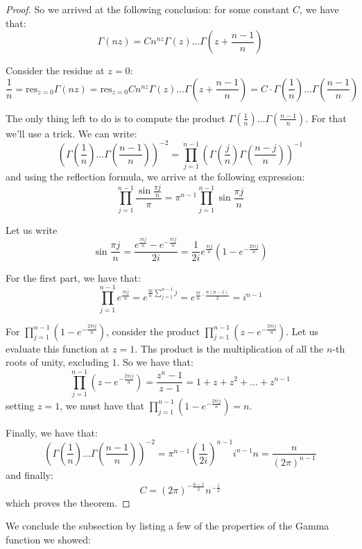 \documentclass[11pt]{article} %
\theoremstyle{definition}
\theoremstyle{remark}
\newcommand{\res}{\text{res}}
\begin{document}
\begin{proof}
So we arrived at the following conclusion: for some constant $C$, we have that:
\[ \Gamma\left(nz\right) = Cn^{nz} \Gamma\left(z\right)\dots\Gamma\left(z + \frac{n-1}{n}\right) \]

Consider the residue at $z = 0$:
\[ \frac{1}{n} = \res_{z=0} \Gamma\left(nz\right) = \res_{z=0} Cn^{nz}\Gamma\left(z\right)\dots\Gamma\left(z+\frac{n-1}{n}\right) = C\cdot\Gamma\left(\frac{1}{n}\right)\dots\Gamma\left(\frac{n-1}{n}\right)\]

The only thing left to do is to compute the product $\Gamma\left(\frac{1}{n}\right)\dots\Gamma\left(\frac{n-1}{n}\right)$. For that we'll use a trick. We can write:
\[ \left(\Gamma\left(\frac{1}{n}\right)\dots\Gamma\left(\frac{n-1}{n}\right)\right)^{-2} = \prod_{j=1}^{n-1} \left(\Gamma\left(\frac{j}{n}\right)\Gamma\left(\frac{n-j}{n}\right)\right)^{-1} \]
and using the reflection formula, we arrive at the following expression:
\[ \prod_{j=1}^{n-1}\frac{\sin\frac{\pi j}{n}}{\pi} = \pi^{n-1} \prod_{j=1}^{n-1}\sin\frac{\pi j}{n}\]

Let us write
\[ \sin \frac{\pi j}{n} = \frac{e^{\frac{\pi i j}{n}} - e^{-\frac{\pi i j }{n}}}{2i} = \frac{1}{2i}e^{\frac{\pi i j}{n}}\left(1 - e^{-\frac{2\pi i j}{n}}\right)\]

For the first part, we have that:
\[ \prod_{j=1}^{n-1} e^{\frac{\pi i j}{n}} = e^{\frac{\pi i}{n}\sum_{j=1}^{n-1}j} = e^{\frac{\pi i}{n} \cdot \frac{n\left(n-1\right)}{2}} = i^{n-1} \]

For $\prod_{j=1}^{n-1}\left(1 - e^{-\frac{2\pi i j}{n}}\right)$, consider the product $\prod_{j=1}^{n-1}\left(z - e^{-\frac{2\pi i j}{n}}\right)$. Let us evaluate this function at $z = 1$. Ths product is the multiplication of all the $n$-th roots of unity, excluding $1$. So we have that:
\[ \prod_{j=1}^{n-1}\left(z - e^{-\frac{2\pi i j}{n}}\right) = \frac{z^n - 1}{z - 1} = 1 + z + z^2 + \dots + z^{n-1} \]
setting $z = 1$, we must have that $\prod_{j=1}^{n-1}\left(1 - e^{-\frac{2\pi i j}{n}}\right) = n$.

Finally, we have that:
\[ \left(\Gamma\left(\frac{1}{n}\right)\dots\Gamma\left(\frac{n-1}{n}\right)\right)^{-2} = \pi^{n-1} \left(\frac{1}{2i}\right)^{n-1} i^{n-1} n = \frac{n}{\left(2 \pi\right)^{n-1}}\]
and finally:
\[ C = \left(2\pi\right)^{-\frac{n-1}{2}}n^{-\frac{1}{2}}\]
which proves the theorem.
\end{proof}

We conclude the subsection by listing a few of the properties of the Gamma function we showed:
\end{document}
